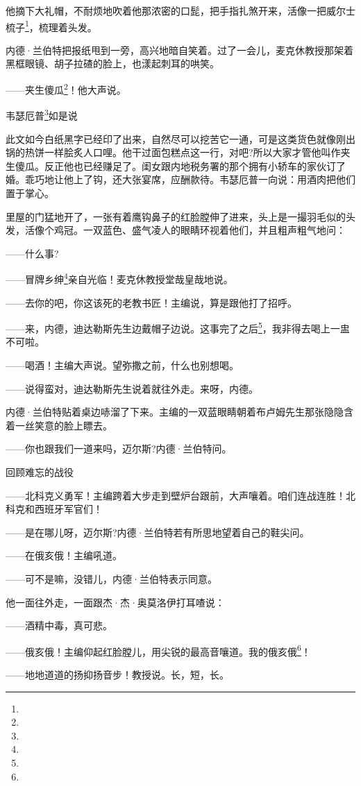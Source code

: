 \par 他摘下大礼帽，不耐烦地吹着他那浓密的口髭，把手指扎煞开来，活像一把威尔士梳子\footnote{}，梳理着头发。
\par 内德·兰伯特把报纸甩到一旁，高兴地暗自笑着。过了一会儿，麦克休教授那架着黑框眼镜、胡子拉碴的脸上，也漾起刺耳的哄笑。
\par ——夹生傻瓜\footnote{}！他大声说。
\par 韦瑟厄普\footnote{}如是说
\par 此文如今白纸黑字已经印了出来，自然尽可以挖苦它一通，可是这类货色就像刚出锅的热饼一样脍炙人口哩。他干过面包糕点这一行，对吧?所以大家才管他叫作夹生傻瓜。反正他也已经赚足了。闺女跟内地税务署的那个拥有小轿车的家伙订了婚。乖巧地让他上了钩，还大张宴席，应酬款待。韦瑟厄普一向说：用酒肉把他们置于掌心。
\par 里屋的门猛地开了，一张有着鹰钩鼻子的红脸膛伸了进来，头上是一撮羽毛似的头发，活像个鸡冠。一双蓝色、盛气凌人的眼睛环视着他们，并且粗声粗气地问：
\par ——什么事?
\par ——冒牌乡绅\footnote{}亲自光临！麦克休教授堂哉皇哉地说。
\par ——去你的吧，你这该死的老教书匠！主编说，算是跟他打了招呼。
\par ——来，内德，迪达勒斯先生边戴帽子边说。这事完了之后\footnote{}，我非得去喝上一盅不可啦。
\par ——喝酒！主编大声说。望弥撒之前，什么也别想喝。
\par ——说得蛮对，迪达勒斯先生说着就往外走。来呀，内德。
\par 内德·兰伯特贴着桌边哧溜了下来。主编的一双蓝眼睛朝着布卢姆先生那张隐隐含着一丝笑意的脸上瞟去。
\par ——你也跟我们一道来吗，迈尔斯?内德·兰伯特问。
\par 回顾难忘的战役
\par ——北科克义勇军！主编跨着大步走到壁炉台跟前，大声嚷着。咱们连战连胜！北科克和西班牙军官们！
\par ——是在哪儿呀，迈尔斯?内德·兰伯特若有所思地望着自己的鞋尖问。
\par ——在俄亥俄！主编吼道。
\par ——可不是嘛，没错儿，内德·兰伯特表示同意。
\par 他一面往外走，一面跟杰·杰·奥莫洛伊打耳喳说：
\par ——酒精中毒，真可悲。
\par ——俄亥俄！主编仰起红脸膛儿，用尖锐的最高音嚷道。我的俄亥俄\footnote{}！
\par ——地地道道的扬抑扬音步！教授说。长，短，长。
